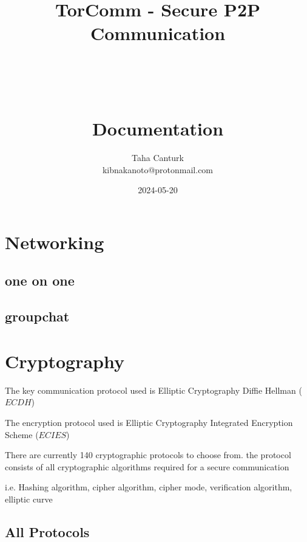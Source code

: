 \documentclass[a4paper,12pt]{article}
\title{
	\Huge TorComm - Secure P2P Communication \\
	\ \\
	\ \\
	\ \\
	\Large Documentation
}
\author{Taha Canturk\\kibnakanoto@protonmail.com}
\date{2024-05-20}
\begin{document}
\maketitle

\newpage


\newpage

\tableofcontents

\newpage


\section{Networking}

\subsection{one on one}

\subsection{groupchat}

\section{Cryptography}

The key communication protocol used is Elliptic Cryptography Diffie Hellman ($ECDH$)

The encryption protocol used is Elliptic Cryptography Integrated Encryption Scheme ($ECIES$)

There are currently 140 cryptographic protocols to choose from. the protocol consists of all cryptographic algorithms required for a secure communication

i.e. Hashing algorithm, cipher algorithm, cipher mode, verification algorithm, elliptic curve

\subsection{All Protocols}

\tiny
\end{document}
